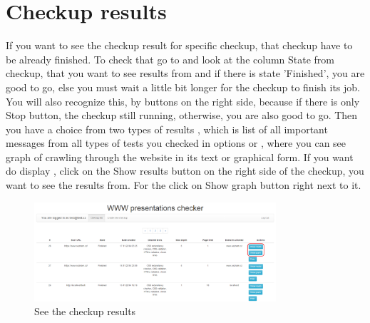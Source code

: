 \documentclass[12pt,a4paper]{article}
\begin{document}
\section{Checkup results} \label{results}
If you want to see the checkup result for specific checkup, that checkup have to be already finished. To check that go to \label{list} and look at the column State from checkup, that you want to see results from and if there is state 'Finished', you are good to go, else you must wait a little bit longer for the checkup to finish its job. You will also recognize this, by buttons on the right side, because if there is only Stop button, the checkup still running, otherwise, you are also good to go. Then you have a choice from two types of results , which is list of all important messages from all types of tests you checked in options or , where you can see graph of crawling through the website in its text or graphical form. If you want do display , click on the Show results button on the right side of the checkup, you want to see the results from. For the  click on Show graph button right next to it.

\begin{figure}[H]
    \centering
    \includegraphics[width=0.8\textwidth]{pictures/results.png}
		\caption{See the checkup results}
		\label{fig:results}
\end{figure}
\end{document}
